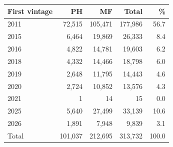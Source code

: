 \begin{tabular}{lrrrr}
\toprule
First vintage & PH & MF & Total & \% \\
\midrule
2011 & 72,515 & 105,471 & 177,986 & 56.7 \\
2015 & 6,464 & 19,869 & 26,333 & 8.4 \\
2016 & 4,822 & 14,781 & 19,603 & 6.2 \\
2018 & 4,332 & 14,466 & 18,798 & 6.0 \\
2019 & 2,648 & 11,795 & 14,443 & 4.6 \\
2020 & 2,724 & 10,852 & 13,576 & 4.3 \\
2021 & 1 & 14 & 15 & 0.0 \\
2025 & 5,640 & 27,499 & 33,139 & 10.6 \\
2026 & 1,891 & 7,948 & 9,839 & 3.1 \\
\midrule
Total & 101,037 & 212,695 & 313,732 & 100.0 \\
\bottomrule
\end{tabular}
